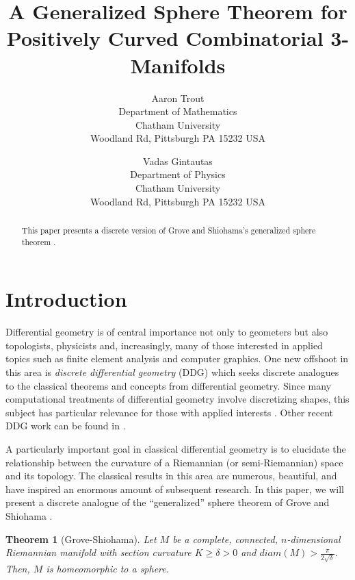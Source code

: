 \documentclass[12pt]{article}
\newtheorem{thm}{Theorem}[section]
\begin{document}
\nocite{*}

\title{A Generalized Sphere Theorem for Positively Curved Combinatorial 3-Manifolds}

\author{Aaron Trout \\ Department of Mathematics \\
Chatham University \\ Woodland Rd, Pittsburgh PA 15232 USA \and
Vadas Gintautas\\ Department of Physics \\
Chatham University \\ Woodland Rd, Pittsburgh PA 15232 USA}


\maketitle

\begin{abstract}
  This paper presents a discrete version of Grove and Shiohama's generalized sphere theorem \cite{groveshiohama}.
\end{abstract}


\section{Introduction}

Differential geometry is of central importance not only to geometers but also topologists, physicists and, increasingly, many of those interested in applied topics such as finite element analysis and computer graphics. One new offshoot in this area is {\em discrete differential geometry} (DDG) which seeks discrete analogues to the classical theorems and concepts from differential geometry. Since many computational treatments of differential geometry involve discretizing shapes, this subject has particular relevance for those with applied interests \cite{grinspun2006discrete}. Other recent DDG work can be found in \cite{BMM,Crowley,EMM,forman2,GGL1,GGL2,GGL3,stone}. 

A particularly important goal in classical differential geometry is to elucidate the relationship between the curvature of a Riemannian (or semi-Riemannian) space and its topology. The classical
results in this area are numerous, beautiful, and have inspired an
enormous amount of subsequent research. In this paper, we will present a discrete analogue of the ``generalized'' sphere theorem of Grove and Shiohama \cite{groveshiohama}.

\begin{thm}[Grove-Shiohama] Let $M$ be a complete, connected, $n$-dimensional Riemannian manifold with section curvature $K \geq \delta > 0$ and $diam(M) > \frac{\pi}{2\sqrt{\delta}}$. Then, $M$ is homeomorphic to a sphere.
\label{Grove-Shiohama}
\end{thm}
\end{document}
